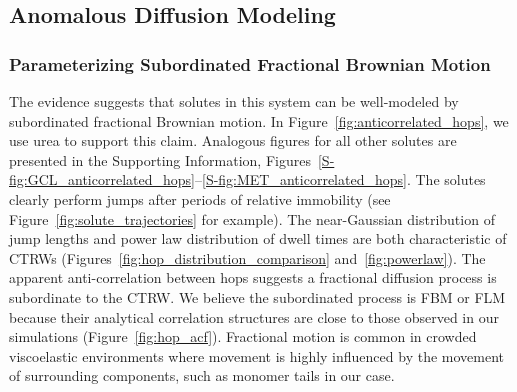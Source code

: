 \documentclass[12pt]{article}
\begin{document}
%  
%    
  
  \subsection{Anomalous Diffusion Modeling}\label{section:sFBM}
  
  \subsubsection{Parameterizing Subordinated Fractional Brownian Motion}\label{section:AD_parameterization}

  The evidence suggests that solutes in this system can be well-modeled by subordinated
  fractional Brownian motion. In Figure~\ref{fig:anticorrelated_hops}, we use urea to
  support this claim. Analogous figures for all other solutes are presented in the Supporting
  Information, Figures~\ref{S-fig:GCL_anticorrelated_hops}--\ref{S-fig:MET_anticorrelated_hops}.
  The solutes clearly perform jumps after periods of relative
  immobility (see Figure~\ref{fig:solute_trajectories} for example). The near-Gaussian distribution
  of jump lengths and power law distribution of dwell times are both characteristic of 
  CTRWs (Figures~\ref{fig:hop_distribution_comparison} and~\ref{fig:powerlaw}). The apparent
  anti-correlation between hops suggests a fractional diffusion process is subordinate to the
  CTRW. We believe the subordinated process is FBM or FLM because their analytical correlation 
  structures are close to those observed in our simulations (Figure~\ref{fig:hop_acf}). Fractional
  motion is common in crowded viscoelastic environments where movement is highly influenced by
  the movement of surrounding components, such as monomer tails in our case.~\cite{ernst_fractional_2012}
  
\end{document}
